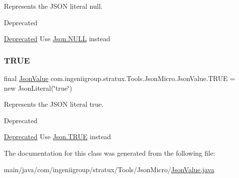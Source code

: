 Represents the J\+S\+ON literal {\ttfamily null}. \begin{DoxyRefDesc}{Deprecated}
\item[\hyperlink{deprecated__deprecated000007}{Deprecated}]Use {\ttfamily \hyperlink{classcom_1_1ingeniigroup_1_1stratux_1_1_tools_1_1_json_micro_1_1_json_a099662304478d72f17898081eead1b67}{Json.\+N\+U\+LL}} instead \end{DoxyRefDesc}
\mbox{\label{classcom_1_1ingeniigroup_1_1stratux_1_1_tools_1_1_json_micro_1_1_json_value_adee76f2b782af0bd340e1b258a47c17e}} 
\subsubsection{\texorpdfstring{T\+R\+UE}{TRUE}}
{\footnotesize\ttfamily final \hyperlink{classcom_1_1ingeniigroup_1_1stratux_1_1_tools_1_1_json_micro_1_1_json_value}{Json\+Value} com.\+ingeniigroup.\+stratux.\+Tools.\+Json\+Micro.\+Json\+Value.\+T\+R\+UE = new Json\+Literal(\char`\"{}true\char`\"{})\hspace{0.3cm}{\ttfamily [static]}}

Represents the J\+S\+ON literal {\ttfamily true}. \begin{DoxyRefDesc}{Deprecated}
\item[\hyperlink{deprecated__deprecated000005}{Deprecated}]Use {\ttfamily \hyperlink{classcom_1_1ingeniigroup_1_1stratux_1_1_tools_1_1_json_micro_1_1_json_a8123cf7272ded3c560cc7b6af000728e}{Json.\+T\+R\+UE}} instead \end{DoxyRefDesc}


The documentation for this class was generated from the following file\+:\begin{DoxyCompactItemize}
\item 
main/java/com/ingeniigroup/stratux/\+Tools/\+Json\+Micro/\hyperlink{_json_value_8java}{Json\+Value.\+java}\end{DoxyCompactItemize}
